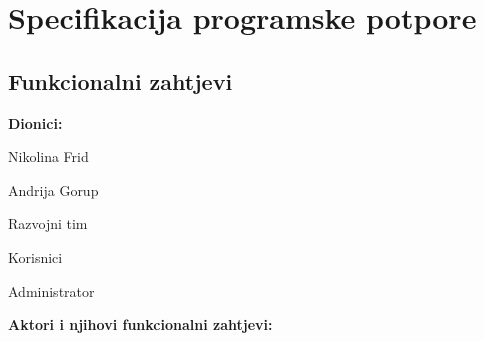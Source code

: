 \chapter{Specifikacija programske potpore}
		
	\section{Funkcionalni zahtjevi}
			
			
				
			
			
			\noindent \textbf{Dionici:}
			
			\begin{packed_enum}
				
				\item Nikolina Frid
				\item Andrija Gorup 
				\item Razvojni tim
				\item Korisnici
				\item Administrator
				
			\end{packed_enum}
			
			\noindent \textbf{Aktori i njihovi funkcionalni zahtjevi:}
			
